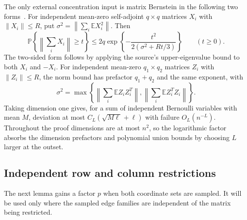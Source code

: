 \documentclass[11pt]{article}
\theoremstyle{remark}
\newcommand{\E}{\mathbb E}
\newcommand{\Prob}{\mathbb P}
\newcommand{\norm}[1]{\left\lVert#1\right\rVert}
\begin{document}
The only external concentration input is matrix Bernstein in the following
two forms~\cite[Theorems 1.4 and 1.6 of the author preprint]{Tropp}.
For independent mean-zero self-adjoint $q\times q$ matrices $X_i$ with
$\norm{X_i}\leq R$, put $\sigma^2=\norm{\sum_i\E X_i^2}$. Then
\begin{equation}\label{eq:bernstein}
 \Prob\left\{\norm{\sum_iX_i}\geq t\right\}
 \leq2q\exp\left\{-\frac{t^2}{2(\sigma^2+Rt/3)}\right\}\qquad(t\geq0).
\end{equation}
The two-sided form follows by applying the source's upper-eigenvalue
bound to both $X_i$ and $-X_i$.
For independent mean-zero $q_1\times q_2$ matrices $Z_i$ with
$\norm{Z_i}\leq R$, the norm bound has prefactor $q_1+q_2$ and the
same exponent, with
\[
 \sigma^2=\max\left\{\norm{\sum_i\E Z_iZ_i^T},
                          \norm{\sum_i\E Z_i^TZ_i}\right\}.
\]
Taking dimension one gives, for a sum of independent Bernoulli variables
with mean $M$, deviation at most $C_L(\sqrt{M\ell}+\ell)$ with failure
$O_L(n^{-L})$. Throughout the proof dimensions are at most $n^2$, so
the logarithmic factor absorbs the dimension prefactors and polynomial
union bounds by choosing $L$ larger at the outset.

\subsection{Independent row and column restrictions}

The next lemma gains a factor $p$ when both coordinate sets are sampled.
It will be used only where the sampled edge families are independent of
the matrix being restricted.
\end{document}
